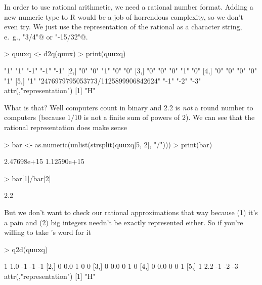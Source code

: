 \documentclass{article}
\begin{document}
In order to use rational arithmetic, we need a rational number format.
Adding a new numeric type to R would be a job of horrendous complexity,
so we don't even try.  We just use the representation of the rational
as a character string, e.~g., \verb@"3/4"@ or \verb@"-15/32"@.
\begin{Schunk}
\begin{Sinput}
> quuxq <- d2q(quux)
> print(quuxq)
\end{Sinput}
\begin{Soutput}
     [,1] [,2]                                [,3] [,4] [,5]
[1,] "1"  "1"                                 "-1" "-1" "-1"
[2,] "0"  "0"                                 "1"  "0"  "0" 
[3,] "0"  "0"                                 "0"  "1"  "0" 
[4,] "0"  "0"                                 "0"  "0"  "1" 
[5,] "1"  "2476979795053773/1125899906842624" "-1" "-2" "-3"
attr(,"representation")
[1] "H"
\end{Soutput}
\end{Schunk}
What is that?  Well computers count in binary and 2.2 is
\emph{not} a round number to computers (because $1/10$ is not a finite sum
of powers of 2).
We can see that the rational representation does make sense
\begin{Schunk}
\begin{Sinput}
> bar <- as.numeric(unlist(strsplit(quuxq[5, 2], "/")))
> print(bar)
\end{Sinput}
\begin{Soutput}
[1] 2.47698e+15 1.12590e+15
\end{Soutput}
\begin{Sinput}
> bar[1]/bar[2]
\end{Sinput}
\begin{Soutput}
[1] 2.2
\end{Soutput}
\end{Schunk}
But we don't want to check our rational approximations that way
because (1) it's a pain and (2) big integers needn't be
exactly represented either.  So if you're willing to take
\verb@rcdd@'s word for it
\begin{Schunk}
\begin{Sinput}
> q2d(quuxq)
\end{Sinput}
\begin{Soutput}
     [,1] [,2] [,3] [,4] [,5]
[1,]    1  1.0   -1   -1   -1
[2,]    0  0.0    1    0    0
[3,]    0  0.0    0    1    0
[4,]    0  0.0    0    0    1
[5,]    1  2.2   -1   -2   -3
attr(,"representation")
[1] "H"
\end{Soutput}
\end{Schunk}
\end{document}
